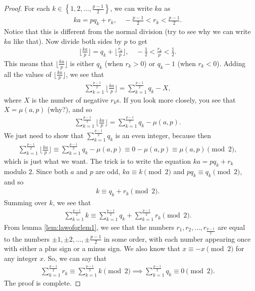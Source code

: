 \documentclass{subfile}
\begin{document}
\begin{proof}
	For each $k \in \left\{1, 2, \dots, \frac{p-1}{2} \right\}$, we can write $ka$ as
	\begin{align*}
	ka = pq_k + r_k, \quad -\frac{p-1}{2}<r_k< \frac{p-1}{2}.
	\end{align*}
	Notice that this is different from the normal division (try to see why we can write $ka$ like that). Now divide both sides by $p$ to get
	\begin{align*}
	\Big\lfloor\frac{ka}{p} \Big\rfloor = q_k + \Big\lfloor\frac{r_k}{p}\Big\rfloor, \quad -\frac{1}{2}<\frac{r_k}{p}< \frac{1}{2}.
	\end{align*}
	This means that $\Big\lfloor\frac{ka}{p} \Big\rfloor$ is either $q_k$ (when $r_k >0$) or $q_k -1$ (when $r_k<0$). Adding all the values of $\Big\lfloor\frac{ka}{p} \Big\rfloor$, we see that
	\begin{align*}
	\displaystyle \sum_{k=1}^{\frac{p-1}{2}} \Big\lfloor\frac{ka}{p} \Big\rfloor = \sum_{k=1}^{\frac{p-1}{2}} q_k - X,
	\end{align*}
	where $X$ is the number of negative $r_k$s. If you look more closely, you see that $X= \mu(a,p)$ (why?), and so
	\begin{align*}
	\displaystyle \sum_{k=1}^{\frac{p-1}{2}} \Big\lfloor\frac{ka}{p} \Big\rfloor = \sum_{k=1}^{\frac{p-1}{2}} q_k - \mu(a,p).
	\end{align*}
	We just need to show that $\displaystyle\sum_{k=1}^{\frac{p-1}{2}} q_k$ is an even integer, because then
	\begin{align*}
	\sum_{k=1}^{\frac{p-1}{2}} \Big\lfloor\frac{ka}{p} \Big\rfloor \equiv \sum_{k=1}^{\frac{p-1}{2}} q_k - \mu(a,p) \equiv 0 -  \mu(a,p) \equiv  \mu(a,p) \pmod 2,
	\end{align*}
	which is just what we want. The trick is to write the equation $ka = pq_k + r_k$ modulo $2$. Since both $a$ and $p$ are odd, $ka \equiv k \pmod 2$ and $pq_k \equiv q_k \pmod 2$, and so
	\begin{align*}
	k \equiv q_k + r_k \pmod 2.
	\end{align*}
	Summing over $k$, we see that
	\begin{align*}
	\sum_{k=1}^{\frac{p-1}{2}}k \equiv \sum_{k=1}^{\frac{p-1}{2}} q_k + \sum_{k=1}^{\frac{p-1}{2}} r_k \pmod 2.
	\end{align*}
	From lemma \eqref{lem:lawofqrlem1}, we see that the numbers $r_1, r_2, \ldots, r_{\frac{p-1}{2}}$ are equal to the numbers $\pm 1, \pm 2, \ldots, \pm \frac{p-1}{2}$ in some order, with each number appearing once with either a plus sign or a minus sign. We also know that $x \equiv -x \pmod 2$ for any integer $x$. So, we can say that
	\begin{align*}
	\sum_{k=1}^{\frac{p-1}{2}} r_k \equiv \sum_{k=1}^{\frac{p-1}{2}}k \pmod 2 \implies \sum_{k=1}^{\frac{p-1}{2}} q_k \equiv 0 \pmod 2.
	\end{align*}
	The proof is complete.
\end{proof}
\end{document}
